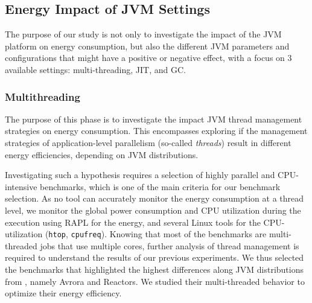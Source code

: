 \subsection{Energy Impact of JVM Settings}
The purpose of our study is not only to investigate the impact of the JVM platform on energy consumption, but also the different JVM parameters and configurations that might have a positive or negative effect, with a focus on 3 available settings: multi-threading, JIT, and GC.

\subsubsection{Multithreading}
The purpose of this phase is to investigate the impact JVM thread management strategies on energy consumption.
This encompasses exploring if the management strategies of application-level parallelism (so-called \emph{threads}) result in different energy efficiencies, depending on JVM distributions.

Investigating such a hypothesis requires a selection of highly parallel and CPU-intensive benchmarks, which is one of the main criteria for our benchmark selection.
As no tool can accurately monitor the energy consumption at a thread level, we monitor the global power consumption and CPU utilization during the execution using RAPL for the energy, and several Linux tools for the CPU-utilization (\texttt{htop}, \texttt{cpufreq}).
Knowing that most of the benchmarks are multi-threaded jobs that use multiple cores, further analysis of thread management is required to understand the results of our previous experiments.
We thus selected the benchmarks that highlighted the highest differences along JVM distributions from , namely \textsf{Avrora} and \textsf{Reactors}.
We studied their multi-threaded behavior to optimize their energy efficiency.

